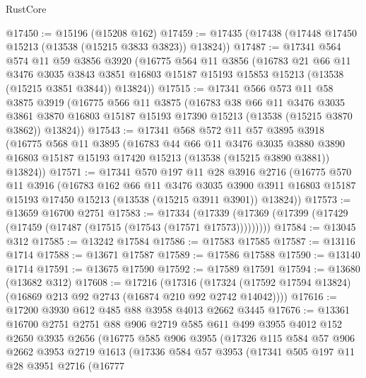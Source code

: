 \begin{lexlean}{RustCore}
\begin{coremodule}
@17450 := @15196 (@15208 @162)
@17459 := @17435 (@17438 (@17448 @17450 @15213 (@13538 (@15215 @3833 @3823)) @13824))
@17487 := @17341
    @564
    @574
    @11
    @59
    @3856
    @3920
    (@16775
      @564
      @11
      @3856
      (@16783
        @21
        @66
        @11
        @3476
        @3035
        @3843
        @3851
        @16803
        @15187
        @15193
        @15853
        @15213
        (@13538 (@15215 @3851 @3844))
        @13824))
@17515 := @17341
    @566
    @573
    @11
    @58
    @3875
    @3919
    (@16775
      @566
      @11
      @3875
      (@16783
        @38
        @66
        @11
        @3476
        @3035
        @3861
        @3870
        @16803
        @15187
        @15193
        @17390
        @15213
        (@13538 (@15215 @3870 @3862))
        @13824))
@17543 := @17341
    @568
    @572
    @11
    @57
    @3895
    @3918
    (@16775
      @568
      @11
      @3895
      (@16783
        @44
        @66
        @11
        @3476
        @3035
        @3880
        @3890
        @16803
        @15187
        @15193
        @17420
        @15213
        (@13538 (@15215 @3890 @3881))
        @13824))
@17571 := @17341
    @570
    @197
    @11
    @28
    @3916
    @2716
    (@16775
      @570
      @11
      @3916
      (@16783
        @162
        @66
        @11
        @3476
        @3035
        @3900
        @3911
        @16803
        @15187
        @15193
        @17450
        @15213
        (@13538 (@15215 @3911 @3901))
        @13824))
@17573 := @13659 @16700 @2751
@17583 := @17334
    (@17339 (@17369 (@17399 (@17429 (@17459 (@17487 (@17515 (@17543 (@17571 @17573)))))))))
@17584 := @13045 @312
@17585 := @13242 @17584
@17586 := @17583 @17585
@17587 := @13116 @1714
@17588 := @13671 @17587
@17589 := @17586 @17588
@17590 := @13140 @1714
@17591 := @13675 @17590
@17592 := @17589 @17591
@17594 := @13680 (@13682 @312)
@17608 := @17216
    (@17316 (@17324 (@17592 @17594 @13824) (@16869 @213 @92 @2743 (@16874 @210 @92 @2742 @14042))))
@17616 := @17200 @3930 @612 @485 @88 @3958 @4013 @2662 @3445
@17676 := @13361
    @16700
    @2751
    @2751
    @88
    @906
    @2719
    @585
    @611
    @499
    @3955
    @4012
    @152
    @2650
    @3935
    @2656
    (@16775
      @585
      @906
      @3955
      (@17326
        @115
        @584
        @57
        @906
        @2662
        @3953
        @2719
        @1613
        (@17336
          @584
          @57
          @3953
          (@17341
            @505
            @197
            @11
            @28
            @3951
            @2716
            (@16777

\end{coremodule}
\end{lexlean}
